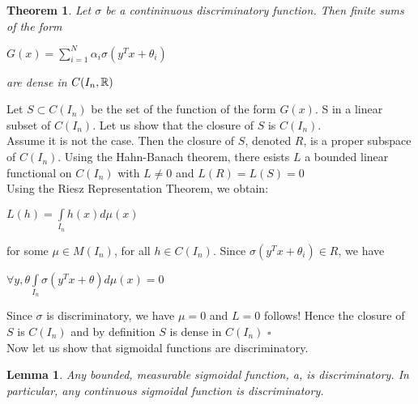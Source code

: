\documentclass[12pt, a4paper]{article}
\newtheorem{theorem}{Theorem}
\newtheorem{lemma}{Lemma}
\newenvironment{proof}{{\sc Proof:}}{\hfill $\square$}
\begin{document}
\begin{theorem}
  Let $\sigma$ be a contininuous discriminatory function. Then finite sums of the form\\\begin{center}
    $G(x) = \sum\limits_{i=1}^N \alpha_i \sigma(y^Tx + \theta_i)$
  \end{center}
  are dense in $C(I_n, \mathbb{R})$
\end{theorem}

\begin{proof}
  Let $S \subset C(I_n)$ be the set of the function of the form $G(x)$. S in a linear subset of $C(I_n)$. Let us show that the closure of $S$ is $C(I_n)$.\\
  Assume it is not the case. Then the closure of $S$, denoted $R$, is a proper subspace of $C(I_n)$. Using the Hahn-Banach theorem, there esists $L$ a bounded linear functional on $C(I_n)$ with $L \ne 0$ and  $L(R) = L(S) = 0$\\
  Using the Riesz Representation Theorem, we obtain:\\
  \begin{center}
    $L(h) = \int\limits_{I_n} h(x)d\mu(x)$
  \end{center}
  for some $\mu \in M(I_n)$, for all $h\in C(I_n)$. Since $\sigma(y^Tx + \theta_i)  \in R$, we have\\
  \begin{center}
    $\forall y, \theta \int\limits_{I_n} \sigma(y^Tx + \theta) d\mu(x) = 0$
  \end{center}
  Since $\sigma$ is discriminatory, we have $\mu = 0$ and $L = 0$ follows!
  Hence the closure of $S$ is $C(I_n)$ and by definition $S$ is dense in $C(I_n)$
\end{proof}\\
\Sv
  Now let us show that sigmoidal functions are discriminatory.
  \begin{lemma}
    Any bounded, measurable sigmoidal function, a, is discriminatory. In particular, any continuous sigmoidal function is discriminatory.
  \end{lemma}
\end{document}
